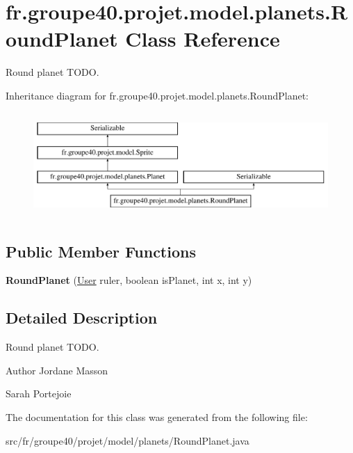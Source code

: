 \hypertarget{classfr_1_1groupe40_1_1projet_1_1model_1_1planets_1_1_round_planet}{}\section{fr.\+groupe40.\+projet.\+model.\+planets.\+Round\+Planet Class Reference}
\label{classfr_1_1groupe40_1_1projet_1_1model_1_1planets_1_1_round_planet}


Round planet T\+O\+DO.  


Inheritance diagram for fr.\+groupe40.\+projet.\+model.\+planets.\+Round\+Planet\+:\begin{figure}[H]
\begin{center}
\leavevmode
\includegraphics[height=4.000000cm]{classfr_1_1groupe40_1_1projet_1_1model_1_1planets_1_1_round_planet}
\end{center}
\end{figure}
\subsection*{Public Member Functions}
\begin{DoxyCompactItemize}
\item 
\mbox{\label{classfr_1_1groupe40_1_1projet_1_1model_1_1planets_1_1_round_planet_a48bb1db2b253cfc635bf1c3a8a55df13}} 
{\bfseries Round\+Planet} (\hyperlink{classfr_1_1groupe40_1_1projet_1_1client_1_1_user}{User} ruler, boolean is\+Planet, int x, int y)
\end{DoxyCompactItemize}


\subsection{Detailed Description}
Round planet T\+O\+DO. 

\begin{DoxyAuthor}{Author}
Jordane Masson 

Sarah Portejoie 
\end{DoxyAuthor}


The documentation for this class was generated from the following file\+:\begin{DoxyCompactItemize}
\item 
src/fr/groupe40/projet/model/planets/Round\+Planet.\+java\end{DoxyCompactItemize}
